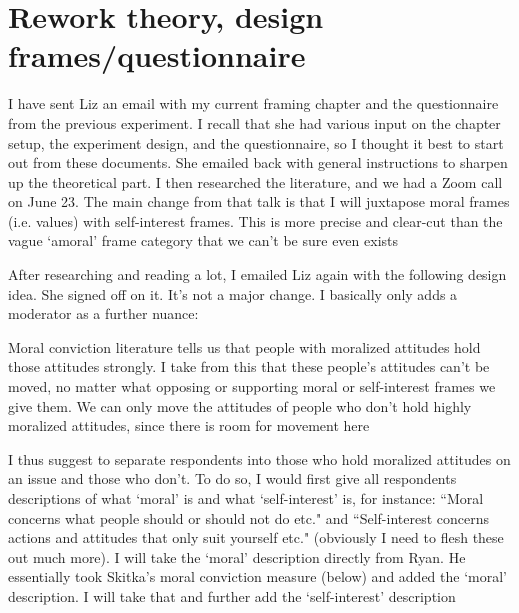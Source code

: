 \section*{Rework theory, design frames/questionnaire}
	\begin{coi}
		\item I have sent Liz an email with my current framing chapter and the questionnaire from the previous experiment. I recall that she had various input on the chapter setup, the experiment design, and the questionnaire, so I thought it best to start out from these documents. She emailed back with general instructions to sharpen up the theoretical part. I then researched the literature, and we had a Zoom call on June 23. The main change from that talk is that I will juxtapose moral frames (i.e. values) with self-interest frames. This is more precise and clear-cut than the vague `amoral' frame category that we can't be sure even exists
		\item After researching and reading a lot, I emailed Liz again with the following design idea. She signed off on it. It's not a major change. I basically only adds a moderator as a further nuance:
			\begin{coi}
				\item Moral conviction literature tells us that people with moralized attitudes hold those attitudes strongly. I take from this that these people's attitudes can't be moved, no matter what opposing or supporting moral or self-interest frames we give them. We can only move the attitudes of people who don't hold highly moralized attitudes, since there is room for movement here
				\item I thus suggest to separate respondents into those who hold moralized attitudes on an issue and those who don't. To do so, I would first give all respondents descriptions of what `moral' is and what `self-interest' is, for instance: ``Moral concerns what people should or should not do etc." and ``Self-interest concerns actions and attitudes that only suit yourself etc." (obviously I need to flesh these out much more). I will take the `moral' description directly from Ryan. He essentially took Skitka's moral conviction measure (below) and added the `moral' description. I will take that and further add the `self-interest' description

\end{coi}
\end{coi}
